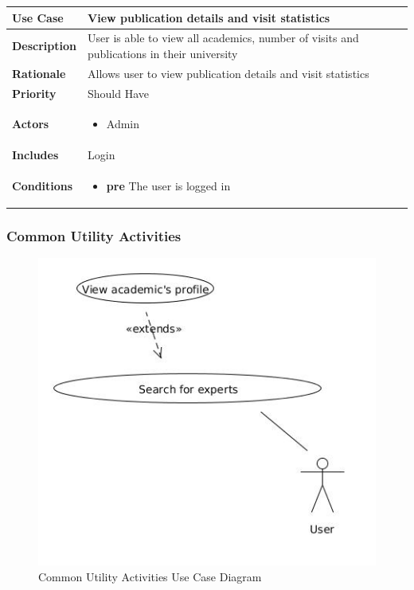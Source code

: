 
\begin{tabular}{|l|p{8.5cm}|}
\hline \textbf{Use Case} & View publication details and visit statistics \\
 \hline \textbf{Description} & User is able to view all academics, number of visits and publications in their university \\
\hline \textbf{Rationale} & Allows user to view publication details and visit statistics \\
\hline \textbf{Priority} & Should Have \\ 
\hline \textbf{Actors} & 
\begin{itemize}
 \item Admin
\end{itemize} \\
\hline \textbf{Includes} & Login \\
\hline \textbf{Conditions} & 
\begin{itemize}
 \item \textbf{pre} The user is logged in
\end{itemize} \\ \hline
\end{tabular}


\subsubsection{Common Utility Activities}

\begin{figure}
\centering
\includegraphics[scale=0.4]{./figures/common_utility_activities.jpg}
\caption{Common Utility Activities Use Case Diagram}
\end{figure}

